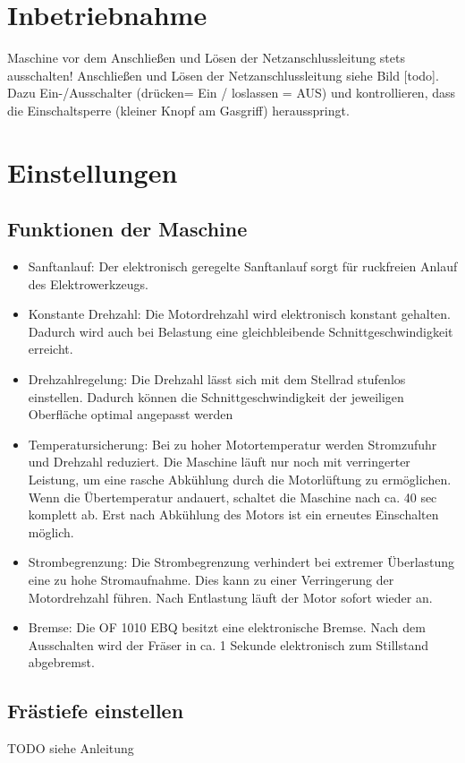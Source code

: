 \documentclass{\basedir/fablab-document}
\begin{document}
\section{Inbetriebnahme}
Maschine vor dem Anschließen und Lösen der Netzanschlussleitung stets ausschalten! Anschließen und Lösen der Netzanschlussleitung siehe Bild [todo].
Dazu Ein-/Ausschalter (drücken= Ein / loslassen = AUS) und kontrollieren, dass die Einschaltsperre (kleiner Knopf am Gasgriff) herausspringt.

\section{Einstellungen}
\subsection{Funktionen der Maschine}
\begin{itemize}
\item Sanftanlauf: Der elektronisch geregelte Sanftanlauf sorgt für ruckfreien Anlauf des Elektrowerkzeugs.
\item Konstante Drehzahl: Die Motordrehzahl wird elektronisch konstant gehalten. Dadurch wird auch bei Belastung eine gleichbleibende Schnittgeschwindigkeit erreicht.
\item Drehzahlregelung: Die Drehzahl lässt sich mit dem Stellrad stufenlos einstellen. Dadurch können die Schnittgeschwindigkeit der jeweiligen Oberfläche optimal angepasst werden 
\item Temperatursicherung: Bei zu hoher Motortemperatur werden Stromzufuhr und Drehzahl reduziert. Die Maschine läuft nur noch mit verringerter Leistung, um eine rasche Abkühlung durch die Motorlüftung zu ermöglichen. Wenn die Übertemperatur andauert, schaltet die Maschine nach ca. 40 sec komplett ab. Erst nach Abkühlung des Motors ist ein erneutes Einschalten möglich.
\item Strombegrenzung: Die Strombegrenzung verhindert bei extremer Überlastung eine zu hohe Stromaufnahme. Dies kann zu einer Verringerung der Motordrehzahl führen. Nach Entlastung läuft der Motor sofort wieder an.
\item Bremse: Die OF 1010 EBQ besitzt eine elektronische Bremse. Nach dem Ausschalten wird der Fräser in ca. 1 Sekunde elektronisch zum Stillstand abgebremst.
\end{itemize}

\subsection{Frästiefe einstellen}
TODO siehe Anleitung
\end{document}
